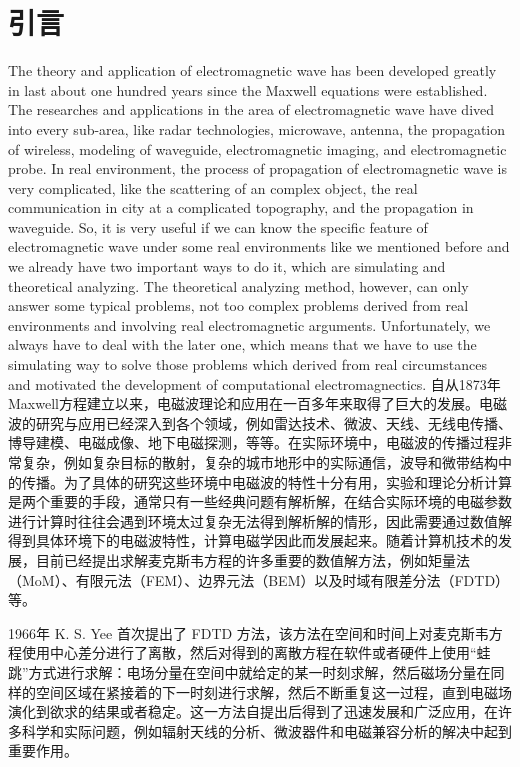 
\chapter{引言}

The theory and application of electromagnetic wave has been developed greatly in last about one hundred years since the Maxwell equations were established. The researches and applications in the area of electromagnetic wave have dived into every sub-area, like radar technologies, microwave, antenna, the propagation of wireless, modeling of waveguide, electromagnetic imaging, and electromagnetic probe. In real environment, the process of propagation of electromagnetic wave is very complicated, like the scattering of an complex object, the real communication in city at a complicated topography, and the propagation in waveguide. So, it is very useful if we can know the specific feature of electromagnetic wave under some real environments like we mentioned before and we already have two important ways to do it, which are simulating and theoretical analyzing. The theoretical analyzing method, however, can only answer some typical problems, not too complex problems derived from real environments and involving real electromagnetic arguments. Unfortunately, we always have to deal with the later one, which means that we have to use the simulating way to solve those problems which derived from real circumstances and motivated the development of computational electromagnectics. 
自从1873年 Maxwell方程建立以来，电磁波理论和应用在一百多年来取得了巨大的发展。电磁波的研究与应用已经深入到各个领域，例如雷达技术、微波、天线、无线电传播、博导建模、电磁成像、地下电磁探测，等等。在实际环境中，电磁波的传播过程非常复杂，例如复杂目标的散射，复杂的城市地形中的实际通信，波导和微带结构中的传播。为了具体的研究这些环境中电磁波的特性十分有用，实验和理论分析计算是两个重要的手段，通常只有一些经典问题有解析解，在结合实际环境的电磁参数进行计算时往往会遇到环境太过复杂无法得到解析解的情形，因此需要通过数值解得到具体环境下的电磁波特性，计算电磁学因此而发展起来。随着计算机技术的发展，目前已经提出求解麦克斯韦方程的许多重要的数值解方法，例如矩量法（MoM）、有限元法（FEM）、边界元法（BEM）以及时域有限差分法（FDTD）等。

1966年 K. S. Yee \cite{Yee} 首次提出了 FDTD 方法，该方法在空间和时间上对麦克斯韦方程使用中心差分进行了离散，然后对得到的离散方程在软件或者硬件上使用“蛙跳”方式进行求解：电场分量在空间中就给定的某一时刻求解，然后磁场分量在同样的空间区域在紧接着的下一时刻进行求解，然后不断重复这一过程，直到电磁场演化到欲求的结果或者稳定。这一方法自提出后得到了迅速发展和广泛应用，在许多科学和实际问题，例如辐射天线的分析、微波器件和电磁兼容分析的解决中起到重要作用。

